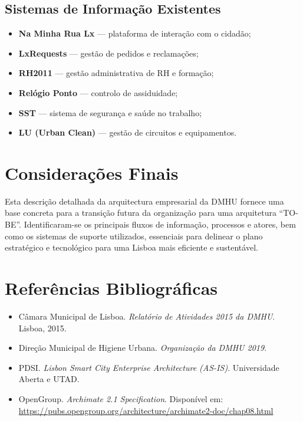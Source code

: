 \documentclass[12pt,a4paper,final]{article}
\begin{document}
    \subsection{Sistemas de Informação Existentes}
    \begin{itemize}
        \item \textbf{Na Minha Rua Lx} — plataforma de interação com o cidadão;
        \item \textbf{LxRequests} — gestão de pedidos e reclamações;
        \item \textbf{RH2011} — gestão administrativa de RH e formação;
        \item \textbf{Relógio Ponto} — controlo de assiduidade;
        \item \textbf{SST} — sistema de segurança e saúde no trabalho;
        \item \textbf{LU (Urban Clean)} — gestão de circuitos e equipamentos.
    \end{itemize}

    \section{Considerações Finais}
    Esta descrição detalhada da arquitectura empresarial da DMHU fornece uma base concreta para a transição futura da organização para uma arquitetura “TO-BE”. Identificaram-se os principais fluxos de informação, processos e atores, bem como os sistemas de suporte utilizados, essenciais para delinear o plano estratégico e tecnológico para uma Lisboa mais eficiente e sustentável.

    \section*{Referências Bibliográficas}
    \begin{itemize}
        \item Câmara Municipal de Lisboa. \textit{Relatório de Atividades 2015 da DMHU}. Lisboa, 2015.
        \item Direção Municipal de Higiene Urbana. \textit{Organização da DMHU 2019}.
        \item PDSI. \textit{Lisbon Smart City Enterprise Architecture (AS-IS)}. Universidade Aberta e UTAD.
        \item OpenGroup. \textit{Archimate 2.1 Specification}. Disponível em: \url{https://pubs.opengroup.org/architecture/archimate2-doc/chap08.html}
    \end{itemize}

    \newpage
    \printbibliography
\end{document}
